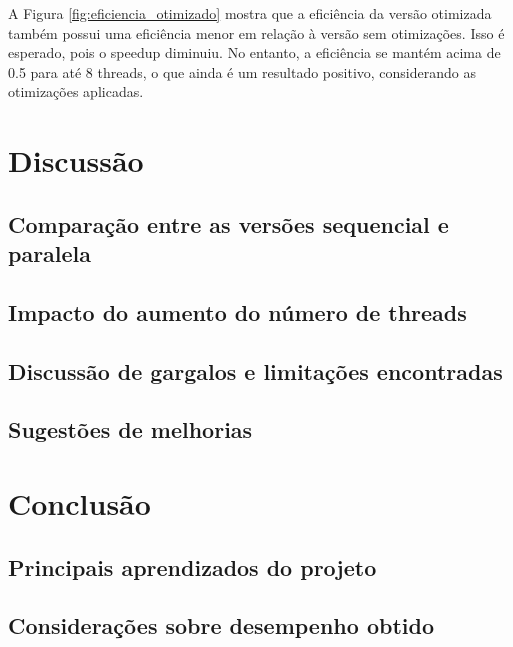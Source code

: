 \documentclass[12pt, a4paper]{article}
\begin{document}
	A Figura \ref{fig:eficiencia_otimizado} mostra que a eficiência da versão otimizada também possui uma eficiência menor em relação à versão sem otimizações.
	Isso é esperado, pois o speedup diminuiu. No entanto, a eficiência se mantém acima de 0.5 para até 8 threads, o que ainda é um resultado positivo, considerando as otimizações aplicadas.

	\section{Discussão}

	\subsection{Comparação entre as versões sequencial e paralela}

	\subsection{Impacto do aumento do número de threads}

	\subsection{Discussão de gargalos e limitações encontradas}

	\subsection{Sugestões de melhorias}

	\section{Conclusão}

	\subsection{Principais aprendizados do projeto}

	\subsection{Considerações sobre desempenho obtido}
\end{document}
